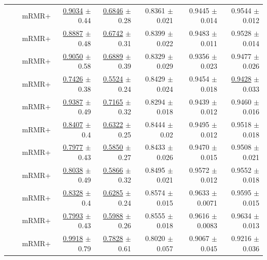 \begin{longtable}{llp{}rrrrr}
 &  & mRMR+ & \underline{0.9034} {\scriptsize $\pm$ 0.44} & \underline{0.6846} {\scriptsize $\pm$ 0.28} & 0.8361 {\scriptsize $\pm$ 0.021} & 0.9445 {\scriptsize $\pm$ 0.014} & 0.9544 {\scriptsize $\pm$ 0.012} \\
 &  & mRMR+ & \underline{0.8887} {\scriptsize $\pm$ 0.48} & \underline{0.6742} {\scriptsize $\pm$ 0.31} & 0.8399 {\scriptsize $\pm$ 0.022} & 0.9483 {\scriptsize $\pm$ 0.011} & 0.9528 {\scriptsize $\pm$ 0.014} \\
 &  & mRMR+ & \underline{0.9050} {\scriptsize $\pm$ 0.58} & \underline{0.6889} {\scriptsize $\pm$ 0.39} & 0.8329 {\scriptsize $\pm$ 0.029} & 0.9356 {\scriptsize $\pm$ 0.023} & 0.9477 {\scriptsize $\pm$ 0.026} \\
 &  & mRMR+ & \underline{0.7426} {\scriptsize $\pm$ 0.38} & \underline{0.5524} {\scriptsize $\pm$ 0.24} & 0.8429 {\scriptsize $\pm$ 0.024} & 0.9454 {\scriptsize $\pm$ 0.018} & \underline{0.9428} {\scriptsize $\pm$ 0.033} \\
 &  & mRMR+ & \underline{0.9387} {\scriptsize $\pm$ 0.49} & \underline{0.7165} {\scriptsize $\pm$ 0.32} & 0.8294 {\scriptsize $\pm$ 0.018} & 0.9439 {\scriptsize $\pm$ 0.012} & 0.9460 {\scriptsize $\pm$ 0.016} \\
 &  & mRMR+ & \underline{0.8407} {\scriptsize $\pm$ 0.4} & \underline{0.6322} {\scriptsize $\pm$ 0.25} & 0.8444 {\scriptsize $\pm$ 0.02} & 0.9495 {\scriptsize $\pm$ 0.012} & 0.9518 {\scriptsize $\pm$ 0.018} \\
 &  & mRMR+ & \underline{0.7977} {\scriptsize $\pm$ 0.43} & \underline{0.5850} {\scriptsize $\pm$ 0.27} & 0.8433 {\scriptsize $\pm$ 0.026} & 0.9470 {\scriptsize $\pm$ 0.015} & 0.9508 {\scriptsize $\pm$ 0.021} \\
 &  & mRMR+ & \underline{0.8038} {\scriptsize $\pm$ 0.49} & \underline{0.5866} {\scriptsize $\pm$ 0.32} & 0.8495 {\scriptsize $\pm$ 0.021} & 0.9572 {\scriptsize $\pm$ 0.012} & 0.9552 {\scriptsize $\pm$ 0.018} \\
 &  & mRMR+ & \underline{0.8328} {\scriptsize $\pm$ 0.4} & \underline{0.6285} {\scriptsize $\pm$ 0.24} & 0.8574 {\scriptsize $\pm$ 0.015} & 0.9633 {\scriptsize $\pm$ 0.0071} & 0.9595 {\scriptsize $\pm$ 0.015} \\
 &  & mRMR+ & \underline{0.7993} {\scriptsize $\pm$ 0.43} & \underline{0.5988} {\scriptsize $\pm$ 0.26} & 0.8555 {\scriptsize $\pm$ 0.018} & 0.9616 {\scriptsize $\pm$ 0.0083} & 0.9634 {\scriptsize $\pm$ 0.013} \\
 &  & mRMR+ & \underline{0.9918} {\scriptsize $\pm$ 0.79} & \underline{0.7828} {\scriptsize $\pm$ 0.61} & 0.8020 {\scriptsize $\pm$ 0.057} & 0.9067 {\scriptsize $\pm$ 0.045} & 0.9216 {\scriptsize $\pm$ 0.036} \\

\end{longtable}

